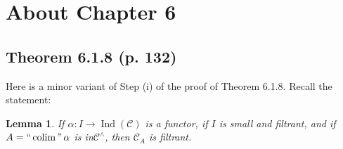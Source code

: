 \documentclass[12pt]{article}%
\newtheorem{lem}[thm]{Lemma}
\theoremstyle{remark}
\theoremstyle{definition}
\newcommand{\C}{\mathcal C}
\DeclareMathOperator*{\colim}{colim}%
\DeclareMathOperator*{\ic}{``\colim"}
\DeclareMathOperator{\Ind}{Ind}
\begin{document}

\section{About Chapter 6}

\subsection{Theorem 6.1.8 (p. 132)}

Here is a minor variant of Step (i) of the proof of Theorem 6.1.8. Recall the statement: 

\begin{lem} 
If $\alpha:I\to\Ind(\C)$ is a functor, if $I$ is small and filtrant, and if $A=\ic\alpha$ is in$\C^\wedge$, then $\C_A$ is filtrant. 
\end{lem} 
\end{document}
